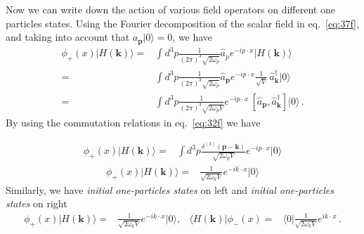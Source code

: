 \begin{frame}
Now we can write down the action of various field operators on different one particles states. 
Using the Fourier decomposition  of the scalar field in eq.~\eqref{eq:37f}, and taking into account that 
$a_{\mathbf{p}}|0\rangle=0$, we have
\begin{align}
   \phi_+(x)|H(\mathbf{k})\rangle=&\int d^3p \frac{1}{(2\pi)^3\sqrt{2\omega_{p} }}
\widehat{a}_{p} e^{-i p\cdot x }
|H(\mathbf{k})\rangle\nonumber\\
=&\int d^3p \frac{1}{(2\pi)^3\sqrt{2\omega_{p}}}
\widehat{a}_\mathbf{p} e^{-i p\cdot x }
\frac{1}{\sqrt{V}}\, \widehat{a}^\dagger_{\mathbf{k}}|0\rangle\nonumber\\
  =&\int d^3p \frac{1}{(2\pi)^3\sqrt{2\omega_{p}V}} e^{-i p\cdot x }
\, [\widehat{a}_{\mathbf{p}},\widehat{a}^\dagger_{\mathbf{k}}]|0\rangle\,.
\end{align}
By using the commutation relations in eq.~\eqref{eq:32f} we have

\begin{align}
\phi_+(x)|H(\mathbf{k})\rangle  
=&\int d^3p \frac{\delta^{(3)}(\mathbf{p}-\mathbf{k})}{\sqrt{2\omega_{p}V}}
 e^{-i p\cdot x }|0\rangle
\end{align}
\begin{align}
\phi_+(x)|H(\mathbf{k})\rangle  
=&\frac{1}{\sqrt{2\omega_{k}V}}e^{-i k\cdot x }|0\rangle
\end{align}
Similarly, we have  \emph{initial one-particles states} on left and \emph{initial one-particles states} on right
\begin{align}
  \label{eq:99f}
  \phi_+(x)|H(\mathbf{k})\rangle=&\frac{1}{\sqrt{2 \omega_k V}}e^{-i k\cdot x}|0\rangle,&
 \langle H(\mathbf{k})|\phi_-(x)=&\langle0|\frac{1}{\sqrt{2 \omega_k V}}e^{i k\cdot x} \,.
\end{align}





\end{frame}
